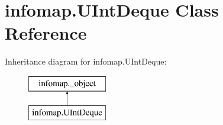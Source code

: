 \hypertarget{classinfomap_1_1UIntDeque}{}\section{infomap.\+U\+Int\+Deque Class Reference}
\label{classinfomap_1_1UIntDeque}
Inheritance diagram for infomap.\+U\+Int\+Deque\+:\begin{figure}[H]
\begin{center}
\leavevmode
\includegraphics[height=2.000000cm]{classinfomap_1_1UIntDeque}
\end{center}
\end{figure}
